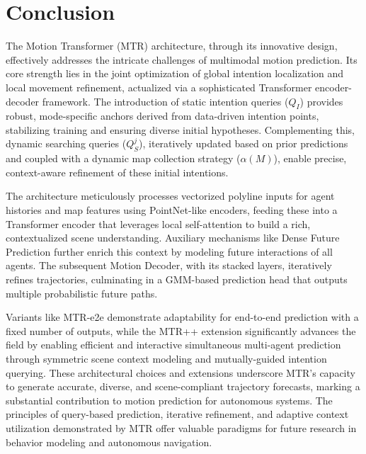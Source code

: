 \section{Conclusion}
\label{sec:conclusion}

The Motion Transformer (MTR) architecture, through its innovative design, effectively addresses the intricate challenges of multimodal motion prediction. Its core strength lies in the joint optimization of global intention localization and local movement refinement, actualized via a sophisticated Transformer encoder-decoder framework. The introduction of static intention queries ($Q_I$) provides robust, mode-specific anchors derived from data-driven intention points, stabilizing training and ensuring diverse initial hypotheses. Complementing this, dynamic searching queries ($Q_S^j$), iteratively updated based on prior predictions and coupled with a dynamic map collection strategy ($\alpha(M)$), enable precise, context-aware refinement of these initial intentions.

The architecture meticulously processes vectorized polyline inputs for agent histories and map features using PointNet-like encoders, feeding these into a Transformer encoder that leverages local self-attention to build a rich, contextualized scene understanding. Auxiliary mechanisms like Dense Future Prediction further enrich this context by modeling future interactions of all agents. The subsequent Motion Decoder, with its stacked layers, iteratively refines trajectories, culminating in a GMM-based prediction head that outputs multiple probabilistic future paths.

Variants like MTR-e2e demonstrate adaptability for end-to-end prediction with a fixed number of outputs, while the MTR++ extension significantly advances the field by enabling efficient and interactive simultaneous multi-agent prediction through symmetric scene context modeling and mutually-guided intention querying. These architectural choices and extensions underscore MTR's capacity to generate accurate, diverse, and scene-compliant trajectory forecasts, marking a substantial contribution to motion prediction for autonomous systems. The principles of query-based prediction, iterative refinement, and adaptive context utilization demonstrated by MTR offer valuable paradigms for future research in behavior modeling and autonomous navigation.
